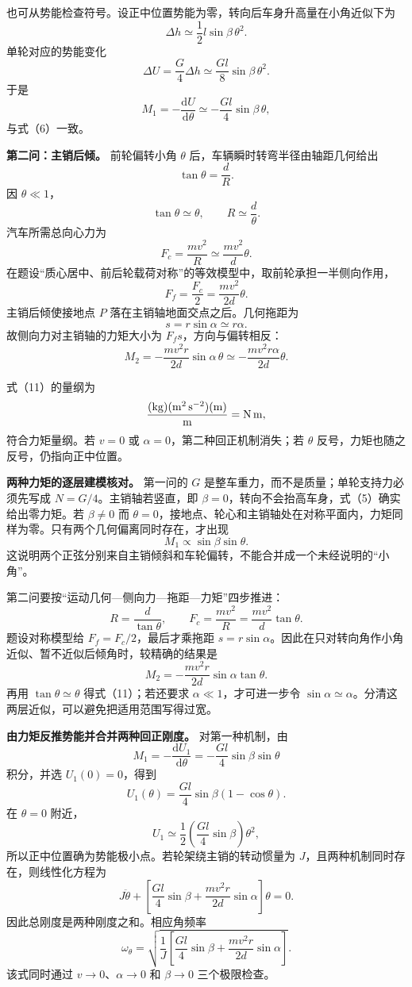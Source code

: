 \documentclass[12pt,a4paper,UTF8]{ctexart}
\begin{document}
也可从势能检查符号。设正中位置势能为零，转向后车身升高量在小角近似下为
\[
\Delta h\simeq\frac12l\sin\beta\,\theta^2.
\] 单轮对应的势能变化 \[
\Delta U=\frac G4\Delta h
\simeq\frac{Gl}{8}\sin\beta\,\theta^2.
\] 于是 \[
M_1=-\frac{\mathrm dU}{\mathrm d\theta}
\simeq-\frac{Gl}{4}\sin\beta\,\theta,
\] 与式（6）一致。

\textbf{第二问：主销后倾。} 前轮偏转小角 \(\theta\)
后，车辆瞬时转弯半径由轴距几何给出 \[
\tan\theta=\frac dR.
\] 因 \(\theta\ll1\)， \[
\tan\theta\simeq\theta,\qquad
R\simeq\frac d\theta. \tag{7}
\] 汽车所需总向心力为 \[
F_c=\frac{mv^2}{R}
\simeq\frac{mv^2}{d}\theta. \tag{8}
\]
在题设``质心居中、前后轮载荷对称''的等效模型中，取前轮承担一半侧向作用，
\[
F_f=\frac{F_c}{2}
=\frac{mv^2}{2d}\theta. \tag{9}
\] 主销后倾使接地点 \(P\) 落在主销轴地面交点之后。几何拖距为 \[
s=r\sin\alpha\simeq r\alpha. \tag{10}
\] 故侧向力对主销轴的力矩大小为 \(F_fs\)，方向与偏转相反： \[
\boxed{
M_2=-\frac{mv^2r}{2d}\sin\alpha\,\theta
\simeq-\frac{mv^2r\alpha}{2d}\theta
}. \tag{11}
\]

式（11）的量纲为 \[
\frac{({\rm kg})({\rm m^2\,s^{-2}})({\rm m})}{\rm m}
={\rm N\,m},
\] 符合力矩量纲。若 \(v=0\) 或 \(\alpha=0\)，第二种回正机制消失；若
\(\theta\) 反号，力矩也随之反号，仍指向正中位置。

\textbf{两种力矩的逐层建模核对。} 第一问的 \(G\)
是整车重力，而不是质量；单轮支持力必须先写成 \(N=G/4\)。主销轴若竖直，即
\(\beta=0\)，转向不会抬高车身，式（5）确实给出零力矩。若 \(\beta\ne0\)
而
\(\theta=0\)，接地点、轮心和主销轴处在对称平面内，力矩同样为零。只有两个几何偏离同时存在，才出现
\[
M_1\propto \sin\beta\sin\theta.
\]
这说明两个正弦分别来自主销倾斜和车轮偏转，不能合并成一个未经说明的``小角''。

第二问要按``运动几何---侧向力---拖距---力矩''四步推进： \[
R=\frac d{\tan\theta},
\qquad
F_c=\frac{mv^2}{R}
=\frac{mv^2}{d}\tan\theta.
\] 题设对称模型给 \(F_f=F_c/2\)，最后才乘拖距
\(s=r\sin\alpha\)。因此在只对转向角作小角近似、暂不近似后倾角时，较精确的结果是
\[
M_2=-\frac{mv^2r}{2d}\sin\alpha\tan\theta.
\] 再用 \(\tan\theta\simeq\theta\) 得式（11）；若还要求
\(\alpha\ll1\)，才可进一步令
\(\sin\alpha\simeq\alpha\)。分清这两层近似，可以避免把适用范围写得过宽。

\textbf{由力矩反推势能并合并两种回正刚度。} 对第一种机制，由 \[
M_1=-\frac{\mathrm dU_1}{\mathrm d\theta}
=-\frac{Gl}{4}\sin\beta\sin\theta
\] 积分，并选 \(U_1(0)=0\)，得到 \[
U_1(\theta)=\frac{Gl}{4}\sin\beta(1-\cos\theta).
\] 在 \(\theta=0\) 附近， \[
U_1\simeq\frac12
\left(\frac{Gl}{4}\sin\beta\right)\theta^2,
\] 所以正中位置确为势能极小点。若轮架绕主销的转动惯量为
\(J\)，且两种机制同时存在，则线性化方程为 \[
J\ddot\theta+
\left[
\frac{Gl}{4}\sin\beta+
\frac{mv^2r}{2d}\sin\alpha
\right]\theta=0.
\] 因此总刚度是两种刚度之和。相应角频率 \[
\omega_\theta=
\sqrt{\frac1J\left[
\frac{Gl}{4}\sin\beta+
\frac{mv^2r}{2d}\sin\alpha
\right]}.
\] 该式同时通过 \(v\to0\)、\(\alpha\to0\) 和 \(\beta\to0\)
三个极限检查。
\end{document}
